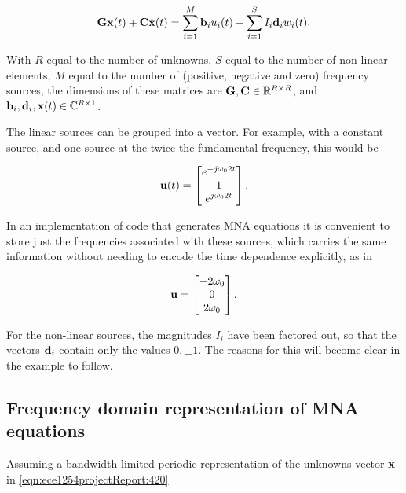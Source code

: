 \documentclass[12pt,journal,compsoc]{../ieeepaper/IEEEtran}
\begin{document}
\begin{equation}\label{eqn:ece1254projectReport:420}
\BG \Bx(t) + \BC \dot{\Bx}(t) = \sum_{i = 1}^M \Bb_i u_i(t) + \sum_{i = 1}^S I_i \Bd_i w_i(t).
\end{equation}

With \( R \) equal to the number of unknowns, \( S \) equal to the number of non-linear elements, \( M \) equal to the number of (positive, negative and zero) frequency sources, the dimensions of these matrices are \( \mathbf{G}, \mathbf{C} \in \text{$\mathbb{R}^{R \times R}$} \), and \( \mathbf{b}_i, \mathbf{d}_i, \mathbf{x}(t) \in \text{$\mathbb{C}^{R \times 1}$} \).

The linear sources can be grouped into a vector.  For example, with a constant source, and one source at the twice the fundamental frequency, this would be

\begin{equation}\label{eqn:ece1254projectReport:440}
\Bu(t) = 
\begin{bmatrix}
e^{ -j \omega_0 2 t } \\
1 \\
e^{ j \omega_0 2 t }
\end{bmatrix},
\end{equation}

In an implementation of code that generates MNA equations it is convenient to store just the frequencies associated with these sources, which carries the same information without needing to encode the time dependence explicitly, as in

\begin{equation}\label{eqn:ece1254projectReport:460}
\Bu =
\begin{bmatrix}
- 2 \omega_0 \\
0 \\
2 \omega_0 
\end{bmatrix}.
\end{equation}

For the non-linear sources, the magnitudes \( I_i \) have been factored out, so that the vectors \( \mathbf{d}_i \) contain only the values \( 0, \pm 1 \).  The reasons for this will become clear in the example to follow.

\subsection{Frequency domain representation of MNA equations}

Assuming a bandwidth limited periodic representation of the unknowns vector \( \mathbf{x} \) in \cref{eqn:ece1254projectReport:420}
\end{document}
